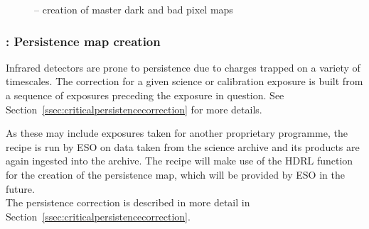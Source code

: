 \begin{figure}[hb]
  \centering
        \def \globalscale {0.700000}
        \fontsize{10}{12}\selectfont
        
  \caption[Recipe: ]{ -- creation of master
    dark and bad pixel maps}
  \label{Fig:rec_det_dark}
\end{figure}
\clearpage
\subsubsection{: Persistence map creation}
\label{sssec:metis_det_persistence}
\label{rec:metis_det_persistence}

Infrared detectors are prone to persistence due to charges trapped on a variety of timescales. The correction for a given science or
calibration exposure is built from a sequence of exposures preceding the exposure in question.
See Section~\ref{ssec:criticalpersistencecorrection} for more details.

As these may include exposures taken for another proprietary programme, the recipe is run by ESO on data taken from the science archive and its products are again ingested into the archive. The recipe will make use of the \ac{HDRL} function for the creation of the persistence map, which will be provided by \ac{ESO} in the future.\\

The persistence correction is described in more detail in Section~\ref{ssec:criticalpersistencecorrection}.


